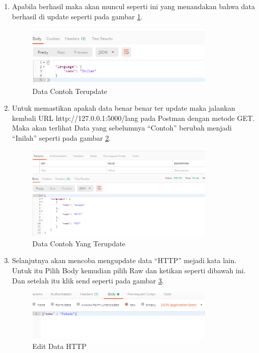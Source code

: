 \begin{enumerate}
\item Apabila berhasil maka akan muncul seperti ini yang menandakan bahwa data berhasil di update seperti pada gambar \ref{fig:dct}.
\begin{figure}[!htbp]
	\centerline{\includegraphics[width=0.85\textwidth]{figures/11/dct.PNG}}
	\caption{Data Contoh Terupdate}
	\label{fig:dct}
\end{figure}

\item Untuk memastikan apakah data benar benar ter update maka jalankan kembali URL http://127.0.0.1:5000/lang pada Postman dengan metode GET. Maka akan terlihat Data yang sebelumnya “Contoh” berubah menjadi “Inilah” seperti pada gambar \ref{fig:dcu}.
\begin{figure}[!htbp]
	\centerline{\includegraphics[width=0.85\textwidth]{figures/11/dcu.PNG}}
	\caption{Data Contoh Yang Terupdate}
	\label{fig:dcu}
\end{figure}
 
\item Selanjutnya akan mencoba mengupdate data “HTTP” mejadi kata lain. Untuk itu Pilih Body kemudian pilih Raw dan ketikan seperti dibawah ini. Dan setelah itu klik send seperti pada gambar \ref{fig:edh}.
\begin{figure}[!htbp]
	\centerline{\includegraphics[width=0.85\textwidth]{figures/11/edh.PNG}}
	\caption{Edit Data HTTP}
	\label{fig:edh}
\end{figure}


\end{enumerate}
